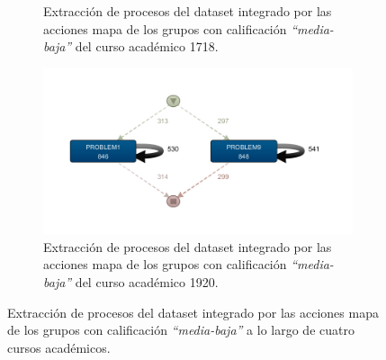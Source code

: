 \begin{figure}[H]
\begin{subfigure}[t]{0.60\textwidth}
    \caption{Extracción de procesos del dataset integrado por las acciones mapa de los grupos con calificación \emph{``media-baja''} del curso académico 1718.}
    \label{fig:mapYear1718MidLowGrades}
  \end{subfigure}
  \hfill
  \begin{subfigure}[t]{0.60\textwidth}
    \includegraphics[width=1.10\textwidth, height=0.80\textwidth]{imagenes/DISCO_map/Dataset FusionadoYear1920MidLowGrades.png}
    \caption{Extracción de procesos del dataset integrado por las acciones mapa de los grupos con calificación \emph{``media-baja''} del curso académico 1920.}
    \label{fig:mapYear1920MidLowGrades}
  \end{subfigure}
  \caption{Extracción de procesos del dataset integrado por las acciones mapa de los grupos con calificación \emph{``media-baja''} a lo largo de cuatro cursos académicos.}
\end{figure}

